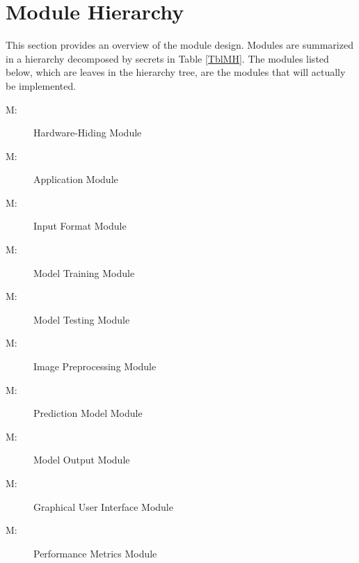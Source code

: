 \documentclass[12pt, titlepage]{article}
\newcounter{mnum}
\newcommand{\mthemnum}{M\themnum}
\begin{document}
\section{Module Hierarchy} \label{SecMH}

This section provides an overview of the module design. Modules are summarized
in a hierarchy decomposed by secrets in Table \ref{TblMH}. The modules listed
below, which are leaves in the hierarchy tree, are the modules that will
actually be implemented.

\begin{description}
\item [ \mthemnum \label{mHH}:] Hardware-Hiding Module
\item [ \mthemnum \label{mApplication}:] Application Module
\item [ \mthemnum \label{mInput}:] Input Format Module
\item [ \mthemnum \label{mTraining}:] Model Training Module
\item [ \mthemnum \label{mTesting}:] Model Testing Module
\item [ \mthemnum \label{mPreprocessing}:] Image Preprocessing Module
\item [ \mthemnum \label{mModel}:] Prediction Model Module
\item [ \mthemnum \label{mOutput}:] Model Output Module
\item [ \mthemnum \label{mGUI}:] Graphical User Interface Module
\item [ \mthemnum \label{mPerformance}:] Performance Metrics Module
\end{description}
\end{document}
